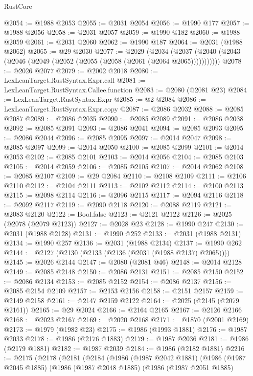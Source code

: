 \begin{lexlean}{RustCore}
\begin{coremodule}
@2054 := @1988 @2053
@2055 := @2031 @2054
@2056 := @1990 @177
@2057 := @1988 @2056
@2058 := @2031 @2057
@2059 := @1990 @182
@2060 := @1988 @2059
@2061 := @2031 @2060
@2062 := @1990 @187
@2064 := @2031 (@1988 @2062)
@2065 := @29 @2030
@2077 := @2029
    (@2034 (@2037 (@2040 (@2043 (@2046 (@2049 (@2052 (@2055 (@2058 (@2061 (@2064 @2065)))))))))))
@2078 := @2026 @2077
@2079 := @2002 @2018
@2080 := LexLeanTarget.RustSyntax.Expr.call
@2081 := LexLeanTarget.RustSyntax.Callee.function
@2083 := @2080 (@2081 @23)
@2084 := LexLeanTarget.RustSyntax.Expr
@2085 := @2 @2084
@2086 := LexLeanTarget.RustSyntax.Expr.copy
@2087 := @2086 @2032
@2088 := @2085 @2087
@2089 := @2086 @2035
@2090 := @2085 @2089
@2091 := @2086 @2038
@2092 := @2085 @2091
@2093 := @2086 @2041
@2094 := @2085 @2093
@2095 := @2086 @2044
@2096 := @2085 @2095
@2097 := @2014 @2047
@2098 := @2085 @2097
@2099 := @2014 @2050
@2100 := @2085 @2099
@2101 := @2014 @2053
@2102 := @2085 @2101
@2103 := @2014 @2056
@2104 := @2085 @2103
@2105 := @2014 @2059
@2106 := @2085 @2105
@2107 := @2014 @2062
@2108 := @2085 @2107
@2109 := @29 @2084
@2110 := @2108 @2109
@2111 := @2106 @2110
@2112 := @2104 @2111
@2113 := @2102 @2112
@2114 := @2100 @2113
@2115 := @2098 @2114
@2116 := @2096 @2115
@2117 := @2094 @2116
@2118 := @2092 @2117
@2119 := @2090 @2118
@2120 := @2088 @2119
@2121 := @2083 @2120
@2122 := Bool.false
@2123 := @2121 @2122
@2126 := @2025 (@2078 (@2079 @2123))
@2127 := @2028 @23
@2128 := @1990 @247
@2130 := @2031 (@1988 @2128)
@2131 := @1990 @252
@2133 := @2031 (@1988 @2131)
@2134 := @1990 @257
@2136 := @2031 (@1988 @2134)
@2137 := @1990 @262
@2144 := @2127 (@2130 (@2133 (@2136 (@2031 (@1988 @2137) @2065))))
@2145 := @2026 @2144
@2147 := @2080 (@2081 @46)
@2148 := @2014 @2128
@2149 := @2085 @2148
@2150 := @2086 @2131
@2151 := @2085 @2150
@2152 := @2086 @2134
@2153 := @2085 @2152
@2154 := @2086 @2137
@2156 := @2085 @2154 @2109
@2157 := @2153 @2156
@2158 := @2151 @2157
@2159 := @2149 @2158
@2161 := @2147 @2159 @2122
@2164 := @2025 (@2145 (@2079 @2161))
@2165 := @29 @2024
@2166 := @2164 @2165
@2167 := @2126 @2166
@2168 := @2023 @2167
@2169 := @2020 @2168
@2171 := @1870 (@2001 @2169)
@2173 := @1979 (@1982 @23)
@2175 := @1986 (@1993 @1881)
@2176 := @1987 @2033
@2178 := @1986 (@2176 @1883)
@2179 := @1987 @2036
@2181 := @1986 (@2179 @1881)
@2182 := @1987 @2039
@2184 := @1986 (@2182 @1881)
@2216 := @2175
    (@2178
      (@2181
        (@2184
          (@1986
            (@1987 @2042 @1881)
            (@1986
              (@1987 @2045 @1885)
              (@1986
                (@1987 @2048 @1885)
                (@1986
                  (@1987 @2051 @1885)

\end{coremodule}
\end{lexlean}
